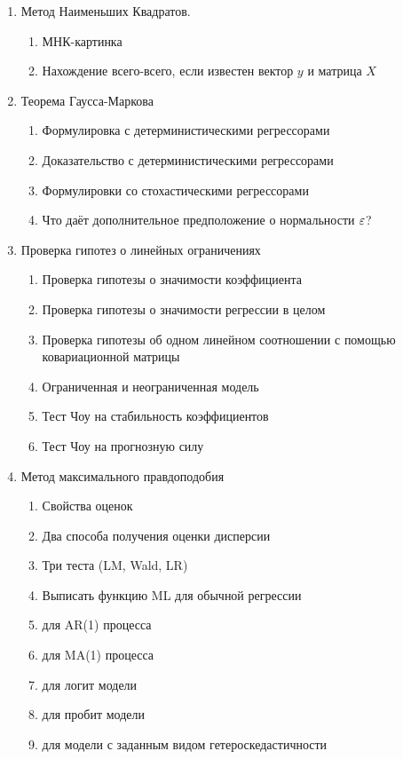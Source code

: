 \documentclass[12pt, a4paper]{article}
\begin{document}
\begin{enumerate}

\item Метод Наименьших Квадратов.

\begin{enumerate}
\item МНК-картинка
\item Нахождение всего-всего, если известен вектор $y$ и матрица $X$
  \end{enumerate}

\item Теорема Гаусса-Маркова
\begin{enumerate}
\item Формулировка с детерминистическими регрессорами
\item Доказательство с детерминистическими регрессорами
\item Формулировки со стохастическими регрессорами
\item Что даёт дополнительное предположение о нормальности $\varepsilon$?
\end{enumerate}

\item Проверка гипотез о линейных ограничениях
\begin{enumerate}
\item Проверка гипотезы о значимости коэффициента
\item Проверка гипотезы о значимости регрессии в целом
\item Проверка гипотезы об одном линейном соотношении с помощью ковариационной матрицы
\item Ограниченная и неограниченная модель
\item Тест Чоу на стабильность коэффициентов
\item Тест Чоу на прогнозную силу
\end{enumerate}

\item Метод максимального правдоподобия

\begin{enumerate}
\item Свойства оценок
\item Два способа получения оценки дисперсии
\item Три теста (LM, Wald, LR)
\item Выписать функцию ML для обычной регрессии
\item для AR(1) процесса
\item для MA(1) процесса
\item для логит модели
\item для пробит модели
\item для модели с заданным видом гетероскедастичности
\end{enumerate}


\end{enumerate}
\end{document}
